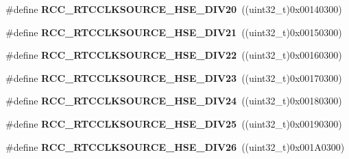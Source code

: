 \begin{DoxyCompactItemize}
\item 
\#define {\bfseries R\+C\+C\+\_\+\+R\+T\+C\+C\+L\+K\+S\+O\+U\+R\+C\+E\+\_\+\+H\+S\+E\+\_\+\+D\+I\+V20}~((uint32\+\_\+t)0x00140300)\hypertarget{group___r_c_c___r_t_c___clock___source_gab72789d4d0c5de2a7e771d538567b92e}{}\label{group___r_c_c___r_t_c___clock___source_gab72789d4d0c5de2a7e771d538567b92e}

\item 
\#define {\bfseries R\+C\+C\+\_\+\+R\+T\+C\+C\+L\+K\+S\+O\+U\+R\+C\+E\+\_\+\+H\+S\+E\+\_\+\+D\+I\+V21}~((uint32\+\_\+t)0x00150300)\hypertarget{group___r_c_c___r_t_c___clock___source_ga70a0ee7e610273af753eca611e959dfc}{}\label{group___r_c_c___r_t_c___clock___source_ga70a0ee7e610273af753eca611e959dfc}

\item 
\#define {\bfseries R\+C\+C\+\_\+\+R\+T\+C\+C\+L\+K\+S\+O\+U\+R\+C\+E\+\_\+\+H\+S\+E\+\_\+\+D\+I\+V22}~((uint32\+\_\+t)0x00160300)\hypertarget{group___r_c_c___r_t_c___clock___source_ga02eac6a5a2eec79514d1637c747d69aa}{}\label{group___r_c_c___r_t_c___clock___source_ga02eac6a5a2eec79514d1637c747d69aa}

\item 
\#define {\bfseries R\+C\+C\+\_\+\+R\+T\+C\+C\+L\+K\+S\+O\+U\+R\+C\+E\+\_\+\+H\+S\+E\+\_\+\+D\+I\+V23}~((uint32\+\_\+t)0x00170300)\hypertarget{group___r_c_c___r_t_c___clock___source_gac707188b45213d39ad11e2440f77e235}{}\label{group___r_c_c___r_t_c___clock___source_gac707188b45213d39ad11e2440f77e235}

\item 
\#define {\bfseries R\+C\+C\+\_\+\+R\+T\+C\+C\+L\+K\+S\+O\+U\+R\+C\+E\+\_\+\+H\+S\+E\+\_\+\+D\+I\+V24}~((uint32\+\_\+t)0x00180300)\hypertarget{group___r_c_c___r_t_c___clock___source_gabc9c05156ca310200f3716af4209594a}{}\label{group___r_c_c___r_t_c___clock___source_gabc9c05156ca310200f3716af4209594a}

\item 
\#define {\bfseries R\+C\+C\+\_\+\+R\+T\+C\+C\+L\+K\+S\+O\+U\+R\+C\+E\+\_\+\+H\+S\+E\+\_\+\+D\+I\+V25}~((uint32\+\_\+t)0x00190300)\hypertarget{group___r_c_c___r_t_c___clock___source_gaef79b940c2bcfee57380e23c4e893767}{}\label{group___r_c_c___r_t_c___clock___source_gaef79b940c2bcfee57380e23c4e893767}

\item 
\#define {\bfseries R\+C\+C\+\_\+\+R\+T\+C\+C\+L\+K\+S\+O\+U\+R\+C\+E\+\_\+\+H\+S\+E\+\_\+\+D\+I\+V26}~((uint32\+\_\+t)0x001\+A0300)\hypertarget{group___r_c_c___r_t_c___clock___source_gaa3d9b9568edda64d88361e76a3a50ed0}{}\label{group___r_c_c___r_t_c___clock___source_gaa3d9b9568edda64d88361e76a3a50ed0}


\end{DoxyCompactItemize}
